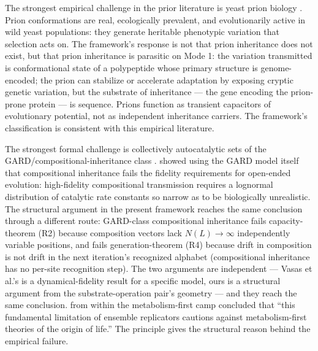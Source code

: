 \documentclass[aps,prx,reprint,amsmath,amssymb,floatfix,superscriptaddress,nofootinbib]{revtex4-2}
\theoremstyle{plain-thm}
\theoremstyle{definition-thm}
\begin{document}
The strongest empirical challenge in the prior literature is yeast prion biology \citep{HalfmannLindquist2010, Halfmann2012}. Prion conformations are real, ecologically prevalent, and evolutionarily active in wild yeast populations: they generate heritable phenotypic variation that selection acts on. The framework's response is not that prion inheritance does not exist, but that prion inheritance is parasitic on Mode 1: the variation transmitted is conformational state of a polypeptide whose primary structure is genome-encoded; the prion can stabilize or accelerate adaptation by exposing cryptic genetic variation, but the substrate of inheritance --- the gene encoding the prion-prone protein --- is sequence. Prions function as transient capacitors of evolutionary potential, not as independent inheritance carriers. The framework's classification is consistent with this empirical literature.

The strongest formal challenge is collectively autocatalytic sets of the GARD/compositional-inheritance class \citep{Kauffman1986, Hordijk2012}. \citet{Vasas2010} showed using the GARD model itself that compositional inheritance fails the fidelity requirements for open-ended evolution: high-fidelity compositional transmission requires a lognormal distribution of catalytic rate constants so narrow as to be biologically unrealistic. The structural argument in the present framework reaches the same conclusion through a different route: GARD-class compositional inheritance fails capacity-theorem (R2) because composition vectors lack $N(L) \to \infty$ independently variable positions, and fails generation-theorem (R4) because drift in composition is not drift in the next iteration's recognized alphabet (compositional inheritance has no per-site recognition step). The two arguments are independent --- Vasas et al.'s is a dynamical-fidelity result for a specific model, ours is a structural argument from the substrate-operation pair's geometry --- and they reach the same conclusion. \citet{Vasas2010} from within the metabolism-first camp concluded that ``this fundamental limitation of ensemble replicators cautions against metabolism-first theories of the origin of life.'' The principle gives the structural reason behind the empirical failure.
\end{document}
